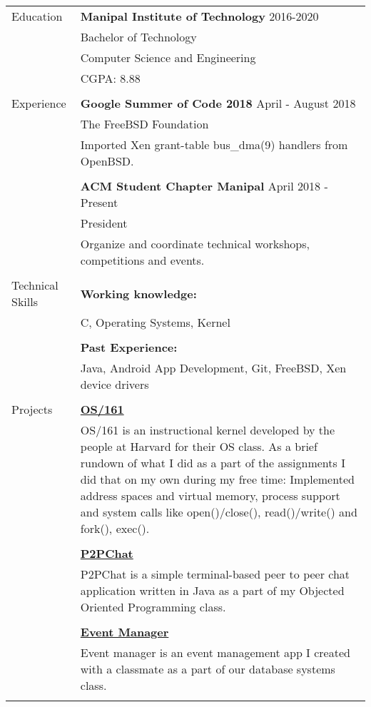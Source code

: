 \documentclass[letterpaper,11pt,oneside]{article}
\begin{document}
\noindent \begin{tabular}{@{} l l}
 \Large{Education} & \textbf{Manipal Institute of Technology} \hfill 2016-2020  \\
     & Bachelor of Technology \\
     & Computer Science and Engineering \\
     &  CGPA: 8.88\\
     & \\
 \Large{Experience}    & \textbf{Google Summer of Code 2018} \hfill April - August 2018 \\
    & The FreeBSD Foundation \\
    & Imported Xen grant-table bus\_dma(9) handlers from OpenBSD. \\
    & \\
    & \textbf{ACM Student Chapter Manipal} \hfill April 2018 -  Present \\
    & President \\
    & Organize and coordinate technical workshops, competitions and events. \\
    & \\
 \Large{Technical Skills} & \textbf{Working knowledge:} \\
    & C, Operating Systems, Kernel \\
    & \\
    & \textbf{Past Experience:} \\
    & Java, Android App Development, Git, FreeBSD, Xen device drivers \\
    & \\
 \Large{Projects} & \textbf{\href{https://github.com/prati0100/OS161}{OS/161}} \vspace{1ex} \\
    & \parbox{5.0in}{OS/161 is an instructional kernel developed by the people at Harvard for their OS class. As a brief rundown of what I did as a part of the assignments I did that on my own during my free time: Implemented address spaces and virtual memory, process support and system calls like open()/close(), read()/write() and fork(), exec().} \\
    & \\
    & \textbf{\href{https://github.com/prati0100/P2PChat}{P2PChat}} \vspace{1ex} \\
    & \parbox{5.0in}{P2PChat is a simple terminal-based peer to peer chat application written in Java as a part of my Objected Oriented Programming class.} \\
    & \\
    & \textbf{\href{https://github.com/prati0100/EventManager}{Event Manager}} \vspace{1ex} \\
    & \parbox{5.0in}{Event manager is an event management app I created with a classmate as a part of our database systems class.} \\
    & \\

\end{tabular}
\end{document}
